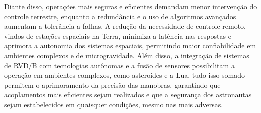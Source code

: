 Diante disso, operações mais seguras e eficientes demandam menor intervenção do controle terrestre, enquanto a redundância e o uso de algoritmos avançados aumentam a tolerância a falhas. A redução da necessidade de controle remoto, vindos de estações espaciais na Terra, minimiza a latência nas respostas e aprimora a autonomia dos sistemas espaciais, permitindo maior confiabilidade em ambientes complexos e de microgravidade. Além disso, a integração de sistemas de RVD/B com tecnologias autônomas e a fusão de sensores possibilitam a operação em ambientes complexos, como asteroides e a Lua, tudo isso somado permitem o aprimoramento da precisão das manobras, garantindo que acoplamentos mais eficientes sejam realizados e que a segurança dos astronautas sejam estabelecidos em quaisquer condições, mesmo nas mais adversas.
